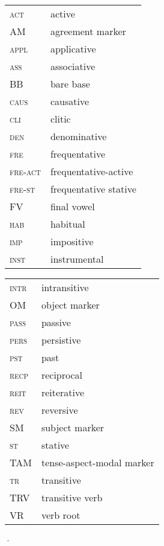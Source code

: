 \documentclass[output=paper		  ]{langscibook}
\begin{document}
\begin{tabularx}{.45\textwidth}{lQ}
\textsc{act} & active\\
AM & agreement marker\\
\textsc{appl} & applicative\\
\textsc{ass} & associative\\
BB & bare base\\
\textsc{caus} & causative\\
\textsc{cli} & clitic\\
\textsc{den} & denominative\\
\textsc{fre} & frequentative\\
\textsc{fre-act} & frequentative-active\\
\textsc{fre-st} & frequentative stative\\
FV &final vowel\\
\textsc{hab} & habitual\\
\textsc{imp} & impositive\\
\textsc{inst} & instrumental\\
\end{tabularx}
\begin{tabularx}{.45\textwidth}{lQ}
\textsc{intr} & intransitive\\
OM & object marker\\
\textsc{pass} & passive\\
\textsc{pers} & persistive\\
\textsc{pst} & past\\
\textsc{recp} & reciprocal\\
\textsc{reit} & reiterative\\
\textsc{rev} & reversive\\
SM & subject marker\\
\textsc{st} & stative\\
TAM & tense-aspect-modal marker\\
\textsc{tr} & transitive\\
TRV &transitive verb\\
VR & verb root
\end{tabularx}·

\printbibliography[heading=subbibliography,notkeyword=this]
\end{document}
